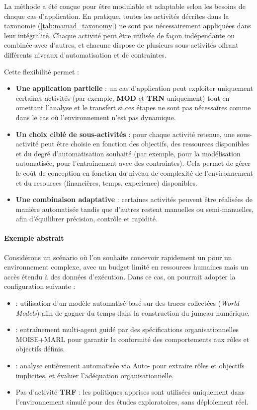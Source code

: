 

La méthode  a été conçue pour être modulable et adaptable selon les besoins de chaque cas d'application.
En pratique, toutes les activités décrites dans la taxonomie (\autoref{tab:mamad_taxonomy}) ne sont pas nécessairement appliquées dans leur intégralité.
Chaque activité peut être utilisée de façon indépendante ou combinée avec d'autres, et chacune dispose de plusieurs sous-activités offrant différents niveaux d'automatisation et de contraintes.

Cette flexibilité permet :
\begin{itemize}
    \item \textbf{Une application partielle} : un cas d'application peut exploiter uniquement certaines activités (par exemple, \textbf{MOD} et \textbf{TRN} uniquement) tout en omettant l'analyse et le transfert si ces étapes ne sont pas nécessaires comme dans le cas où l'environnement n'est pas dynamique.
    \item \textbf{Un choix ciblé de sous-activités} : pour chaque activité retenue, une sous-activité peut être choisie en fonction des objectifs, des ressources disponibles et du degré d'automatisation souhaité (par exemple,  pour la modélisation automatisée,  pour l'entraînement avec des contraintes). Cela permet de gérer le coût de conception en fonction du niveau de complexité de l'environnement et du resources (financières, temps, experience) disponibles.
    \item \textbf{Une combinaison adaptative} : certaines activités peuvent être réalisées de manière automatisée tandis que d'autres restent manuelles ou semi-manuelles, afin d'équilibrer précision, contrôle et rapidité.
\end{itemize}

\paragraph{Exemple abstrait}
Considérons un scénario où l'on souhaite concevoir rapidement un  pour un environnement complexe, avec un budget limité en ressources humaines mais un accès étendu à des données d'exécution.
Dans ce cas, on pourrait adopter la configuration suivante :
\begin{itemize}
    \item {} : utilisation d'un modèle automatisé basé sur des traces collectées (\textit{World Models}) afin de gagner du temps dans la construction du jumeau numérique.
    \item {} : entraînement multi-agent guidé par des spécifications organisationnelles MOISE+MARL pour garantir la conformité des comportements aux rôles et objectifs définis.
    \item {} : analyse entièrement automatisée via Auto- pour extraire rôles et objectifs implicites, et évaluer l'adéquation organisationnelle.
    \item Pas d'activité \textbf{TRF} : les politiques apprises sont utilisées uniquement dans l'environnement simulé pour des études exploratoires, sans déploiement réel.
\end{itemize}

